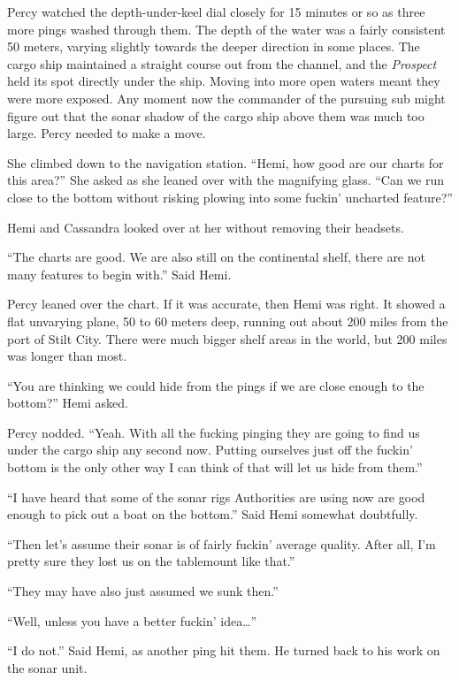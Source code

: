 \documentclass[]{scrbook}
\begin{document}
Percy watched the depth-under-keel dial closely for 15 minutes or so as
three more pings washed through them. The depth of the water was a
fairly consistent 50 meters, varying slightly towards the deeper
direction in some places. The cargo ship maintained a straight course
out from the channel, and the \emph{Prospect} held its spot directly
under the ship. Moving into more open waters meant they were more
exposed. Any moment now the commander of the pursuing sub might figure
out that the sonar shadow of the cargo ship above them was much too
large. Percy needed to make a move.

She climbed down to the navigation station. ``Hemi, how good are our
charts for this area?'' She asked as she leaned over with the magnifying
glass. ``Can we run close to the bottom without risking plowing into
some fuckin' uncharted feature?''

Hemi and Cassandra looked over at her without removing their headsets.

``The charts are good. We are also still on the continental shelf, there
are not many features to begin with.'' Said Hemi.

Percy leaned over the chart. If it was accurate, then Hemi was right. It
showed a flat unvarying plane, 50 to 60 meters deep, running out about
200 miles from the port of Stilt City. There were much bigger shelf
areas in the world, but 200 miles was longer than most.

``You are thinking we could hide from the pings if we are close enough
to the bottom?'' Hemi asked.

Percy nodded. ``Yeah. With all the fucking pinging they are going to
find us under the cargo ship any second now. Putting ourselves just off
the fuckin' bottom is the only other way I can think of that will let us
hide from them.''

``I have heard that some of the sonar rigs Authorities are using now are
good enough to pick out a boat on the bottom.'' Said Hemi somewhat
doubtfully.

``Then let's assume their sonar is of fairly fuckin' average quality.
After all, I'm pretty sure they lost us on the tablemount like that.''

``They may have also just assumed we sunk then.''

``Well, unless you have a better fuckin' idea\ldots{}''

``I do not.'' Said Hemi, as another ping hit them. He turned back to his
work on the sonar unit.
\end{document}
